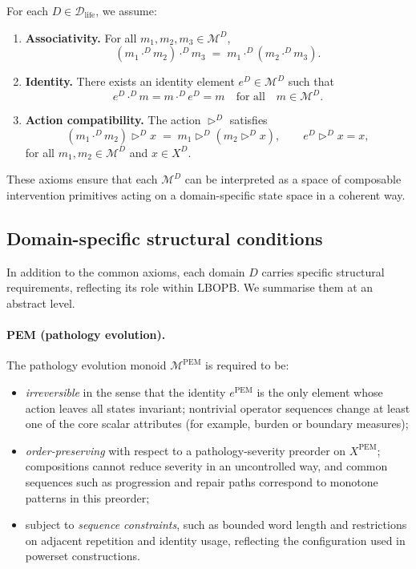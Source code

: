 \documentclass[11pt]{book}
\theoremstyle{plain}
\theoremstyle{definition}
\theoremstyle{remark}
\begin{document}
For each $D \in \mathcal{D}_{\mathrm{life}}$, we assume:

\begin{enumerate}
  \item \textbf{Associativity.}
        For all $m_{1}, m_{2}, m_{3} \in \mathcal{M}^{D}$,
        \[
          (m_{1} \cdot^{D} m_{2}) \cdot^{D} m_{3}
          \;=\;
          m_{1} \cdot^{D} (m_{2} \cdot^{D} m_{3}).
        \]
  \item \textbf{Identity.}
        There exists an identity element $e^{D} \in \mathcal{M}^{D}$
        such that
        \[
          e^{D} \cdot^{D} m = m \cdot^{D} e^{D} = m
          \quad\text{for all}\quad m \in \mathcal{M}^{D}.
        \]
  \item \textbf{Action compatibility.}
        The action $\triangleright^{D}$ satisfies
        \[
          (m_{1} \cdot^{D} m_{2}) \triangleright^{D} x
          \;=\;
          m_{1} \triangleright^{D} (m_{2} \triangleright^{D} x),
          \qquad
          e^{D} \triangleright^{D} x = x,
        \]
        for all $m_{1}, m_{2} \in \mathcal{M}^{D}$ and $x \in X^{D}$.
\end{enumerate}

These axioms ensure that each $\mathcal{M}^{D}$ can be interpreted as a
space of composable intervention primitives acting on a domain-specific
state space in a coherent way.

\subsection*{Domain-specific structural conditions}

In addition to the common axioms, each domain $D$ carries specific
structural requirements, reflecting its role within LBOPB. We summarise
them at an abstract level.

\paragraph{PEM (pathology evolution).}
The pathology evolution monoid $\mathcal{M}^{\mathrm{PEM}}$ is required
to be:
\begin{itemize}
  \item \emph{irreversible} in the sense that the identity
        $e^{\mathrm{PEM}}$ is the only element whose action leaves all
        states invariant; nontrivial operator sequences change at least
        one of the core scalar attributes (for example, burden or
        boundary measures);
  \item \emph{order-preserving} with respect to a pathology-severity
        preorder on $X^{\mathrm{PEM}}$; compositions cannot reduce
        severity in an uncontrolled way, and common sequences such as
        progression and repair paths correspond to monotone patterns in
        this preorder;
  \item subject to \emph{sequence constraints}, such as bounded word
        length and restrictions on adjacent repetition and identity
        usage, reflecting the configuration used in powerset
        constructions.
\end{itemize}
\end{document}
